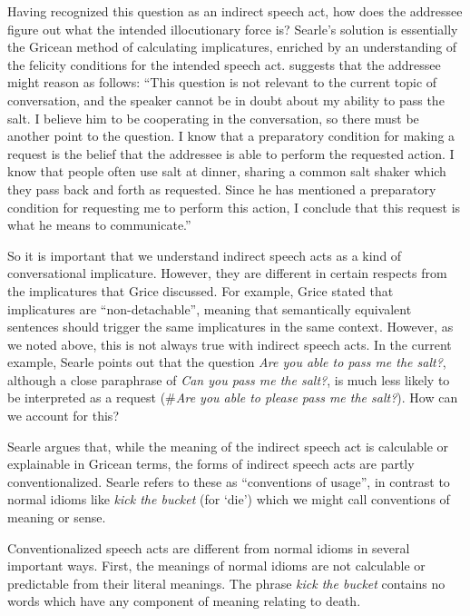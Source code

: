 Having recognized this question as an indirect speech act, how does the addressee figure out what the intended illocutionary force is? Searle’s solution is essentially the Gricean method of calculating implicatures, enriched by an understanding of the felicity conditions for the intended speech act. \citet{Searle1975} suggests that the addressee might reason as follows: “This question is not relevant to the current topic of conversation, and the speaker cannot be in doubt about my ability to pass the salt. I believe him to be cooperating in the conversation, so there must be another point to the question. I know that a preparatory condition for making a request is the belief that the addressee is able to perform the requested action. I know that people often use salt at dinner, sharing a common salt shaker which they pass back and forth as requested. Since he has mentioned a preparatory condition for requesting me to perform this action, I conclude that this request is what he means to communicate.”



So it is important that we understand indirect speech acts as a kind of conversational implicature. However, they are different in certain respects from the implicatures that Grice discussed. For example, Grice stated that implicatures are “non-detachable”, meaning that semantically equivalent sentences should trigger the same implicatures in the same context. However, as we noted above, this is not always true with indirect speech acts. In the current example, Searle points out that the question \textit{Are you able to pass me the salt?}, although a close paraphrase of \textit{Can you pass me the salt?}, is much less likely to be interpreted as a request (\#\textit{Are you able to please pass me the salt?}). How can we account for this?



Searle argues that, while the meaning of the indirect speech act is calculable or explainable in Gricean terms, the forms of indirect speech acts are partly conventionalized. Searle refers to these as “conventions of usage”, in contrast to normal idioms like \textit{kick the bucket} (for ‘die’) which we might call conventions of meaning or sense.



Conventionalized speech acts are different from normal idioms in several important ways. First, the meanings of normal idioms are not calculable or predictable from their literal meanings. The phrase \textit{kick the bucket} contains no words which have any component of meaning relating to death.



